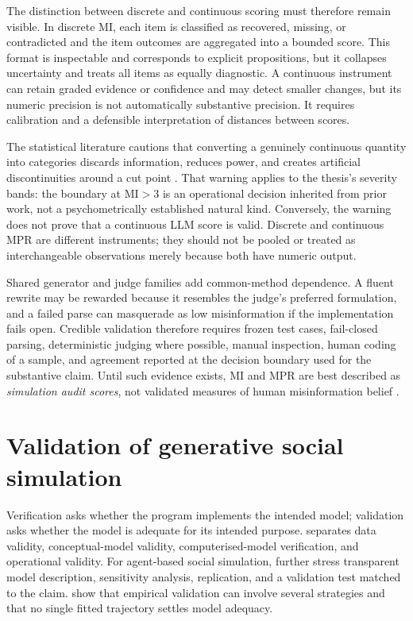 The distinction between discrete and continuous scoring must therefore remain
visible.  In discrete MI, each item is classified as recovered, missing, or
contradicted and the item outcomes are aggregated into a bounded score.
This format is inspectable and corresponds to explicit propositions, but it
collapses uncertainty and treats all items as equally diagnostic.  A continuous
instrument can retain graded evidence or confidence and may detect smaller
changes, but its numeric precision is not automatically substantive precision.
It requires calibration and a defensible interpretation of distances between
scores.

The statistical literature cautions that converting a genuinely continuous
quantity into categories discards information, reduces power, and creates
artificial discontinuities around a cut point
\parencite{maccallum2002dichotomization,altman2006cost}.  That warning applies to
the thesis's severity bands: the boundary at MI${}>3$ is an operational decision
inherited from prior work, not a psychometrically established natural kind.
Conversely, the warning does not prove that a continuous LLM score is valid.
Discrete and continuous MPR are different instruments; they should not be pooled
or treated as interchangeable observations merely because both have numeric
output.

Shared generator and judge families add common-method dependence.  A fluent
rewrite may be rewarded because it resembles the judge's preferred formulation,
and a failed parse can masquerade as low misinformation if the implementation
fails open.  Credible validation therefore requires frozen test cases,
fail-closed parsing, deterministic judging where possible, manual inspection,
human coding of a sample, and agreement reported at the decision boundary used
for the substantive claim.  Until such evidence exists, MI and MPR are best
described as \emph{simulation audit scores}, not validated measures of human
misinformation belief \parencite{lewandowsky2012misinformation}.

\section{Validation of generative social simulation}
\label{sec:lit-simulation-validation}

Verification asks whether the program implements the intended model; validation
asks whether the model is adequate for its intended purpose.
\textcite{sargent2013verification} separates data validity, conceptual-model
validity, computerised-model verification, and operational validity.  For
agent-based social simulation, \textcite{richiardi2006protocol} further stress
transparent model description, sensitivity analysis, replication, and a
validation test matched to the claim.  \textcite{windrum2007validation} show that
empirical validation can involve several strategies and that no single fitted
trajectory settles model adequacy.

